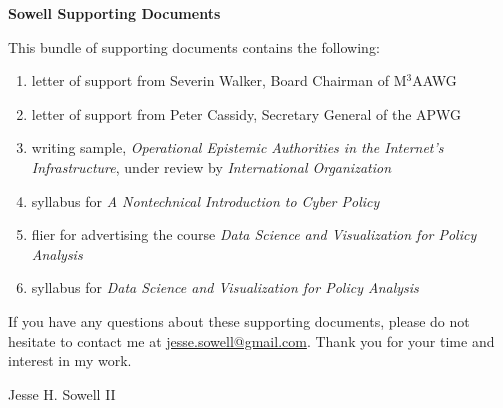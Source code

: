 \documentclass[11pt]{letter}
\begin{document}
\vspace{4\baselineskip}

\noindent
\textbf{Sowell Supporting Documents}

\noindent
This bundle of supporting documents contains the following:

\begin{enumerate}
  \item letter of support from Severin Walker, Board Chairman of M$^3$AAWG
  \item letter of support from Peter Cassidy, Secretary General of the APWG
  \item writing sample, \emph{Operational Epistemic Authorities in the Internet's Infrastructure}, under review by \emph{International Organization}
  \item syllabus for \emph{A Nontechnical Introduction to Cyber Policy}
  \item flier for advertising the course \emph{Data Science and Visualization for Policy Analysis}
  \item syllabus for \emph{Data Science and Visualization for Policy Analysis}
\end{enumerate}

\noindent
If you have any questions about these supporting documents, please do not hesitate to contact me at \href{mailto:jesse.sowell@gmail.com}{jesse.sowell@gmail.com}.  Thank you for your time and interest in my work.

\vspace{4\baselineskip}

\noindent
Jesse H. Sowell II
\end{document}

